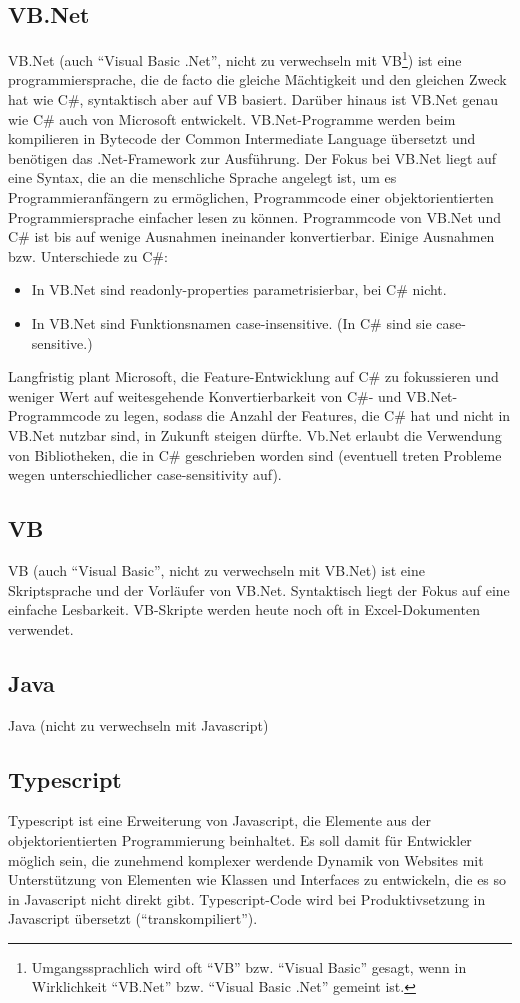 \begin{multicols}{3}
\subsection{VB.Net}
VB.Net (auch \enquote{Visual Basic .Net}, nicht zu verwechseln mit VB\footnote{Umgangssprachlich wird oft \enquote{VB} bzw. \enquote{Visual Basic} gesagt, wenn in Wirklichkeit \enquote{VB.Net} bzw. \enquote{Visual Basic .Net} gemeint ist.}) ist eine programmiersprache, die de facto die gleiche Mächtigkeit und den gleichen Zweck hat wie C\#, syntaktisch aber auf VB basiert. Darüber hinaus ist VB.Net genau wie C\# auch von Microsoft entwickelt. VB.Net-Programme werden beim kompilieren in Bytecode der Common Intermediate Language übersetzt und benötigen das .Net-Framework zur Ausführung. Der Fokus bei VB.Net liegt auf eine Syntax, die an die menschliche Sprache angelegt ist, um es Programmieranfängern zu ermöglichen, Programmcode einer objektorientierten Programmiersprache einfacher lesen zu können. Programmcode von VB.Net und C\# ist bis auf wenige Ausnahmen ineinander konvertierbar. Einige Ausnahmen bzw. Unterschiede zu C\#:\\
\begin{itemize}
\item In VB.Net sind readonly-properties parametrisierbar, bei C\# nicht.
\item In VB.Net sind Funktionsnamen case-insensitive. (In C\# sind sie case-sensitive.)
\end{itemize}
Langfristig plant Microsoft, die Feature-Entwicklung auf C\# zu fokussieren und weniger Wert auf weitesgehende Konvertierbarkeit von C\#- und VB.Net-Programmcode zu legen, sodass die Anzahl der Features, die C\# hat und nicht in VB.Net nutzbar sind, in Zukunft steigen dürfte. Vb.Net erlaubt die Verwendung von Bibliotheken, die in C\# geschrieben worden sind (eventuell treten Probleme wegen unterschiedlicher case-sensitivity auf).
\subsection{VB}
VB (auch \enquote{Visual Basic}, nicht zu verwechseln mit VB.Net) ist eine Skriptsprache und der Vorläufer von VB.Net. Syntaktisch liegt der Fokus auf eine einfache Lesbarkeit. VB-Skripte werden heute noch oft in Excel-Dokumenten verwendet.
\subsection{Java}
Java (nicht zu verwechseln mit Javascript) 
\subsection{Typescript}
Typescript ist eine Erweiterung von Javascript, die Elemente aus der objektorientierten Programmierung beinhaltet. Es soll damit für Entwickler möglich sein, die zunehmend komplexer werdende Dynamik von Websites mit Unterstützung von Elementen wie Klassen und Interfaces zu entwickeln, die es so in Javascript nicht direkt gibt. Typescript-Code wird bei Produktivsetzung in Javascript übersetzt (\enquote{transkompiliert}).

\end{multicols}
